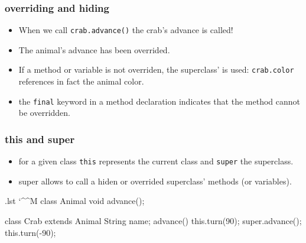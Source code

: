 \documentclass[10pt,handout]{beamer}
\makeatletter
\newenvironment{code}{%
  \begingroup
  \@bsphack
  \immediate\openout\lstvrb@out\jobname.lst
  \let\do\@makeother\dospecials\catcode`\^^M\active
  \def\verbatim@processline{%
    \immediate\write\lstvrb@out{\the\verbatim@line}}%
  \verbatim@start}{%
  \immediate\closeout\lstvrb@out
  \@esphack
  \endgroup
  
  \begin{alertblock}{}
    
  \end{alertblock}}
\makeatother
\begin{document}
\begin{frame}[fragile]
\frametitle{overriding and hiding}
\begin{itemize}
  \item When we call \verb!crab.advance()! the crab's advance is called!
  \item The animal's advance has been overrided.
  \item If a method or variable is not overriden, the superclass' is used:
        \verb!crab.color! references in fact the animal color.
  \item the \alert{\verb!final!} keyword in a method declaration indicates that the method cannot be overridden.
\end{itemize}

\end{frame}

\begin{frame}
\frametitle{this and super}
  \begin{itemize}
    \item for a given class \alert{\verb!this!} represents the current class and \alert{\verb!super!} the superclass. 
    \item super allows to call a hiden or overrided superclass' methods (or variables).
  \end{itemize}
  \begin{code}
class Animal {
  void advance();    
}

class Crab extends Animal{
  String name;
  advance() {
    this.turn(90);
    super.advance();
    this.turn(-90);
  }
}
\end{code}
\end{frame}
\end{document}

